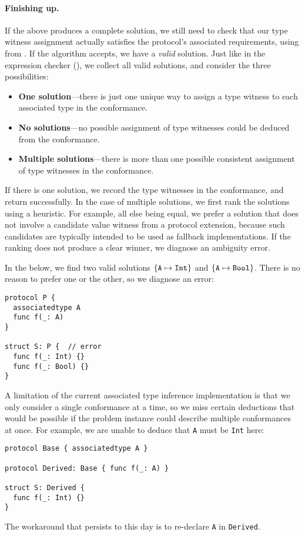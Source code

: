 \documentclass[../generics]{subfiles}
\begin{document}
\paragraph{Finishing up.}
If the above produces a complete solution, we still need to check that our type witness assignment actually satisfies the protocol's associated requirements, using  from . If the algorithm accepts, we have a \emph{valid} solution. Just like in the expression checker (), we collect all valid solutions, and consider the three possibilities:
\begin{itemize}
\item \textbf{One solution}---there is just one unique way to assign a type witness to each associated type in the conformance.
\item \textbf{No solutions}---no possible assignment of type witnesses could be deduced from the conformance.
\item \textbf{Multiple solutions}---there is more than one possible consistent assignment of type witnesses in the conformance.
\end{itemize}
If there is one solution, we record the type witnesses in the conformance, and return successfully. In the case of multiple solutions, we first rank the solutions using a heuristic. For example, all else being equal, we prefer a solution that does not involve a candidate value witness from a protocol extension, because such candidates are typically intended to be used as fallback implementations. If the ranking does not produce a clear winner, we diagnose an ambiguity error.

\begin{example}\label{ambiguous associated type example}
In the below, we find two valid solutions $\{\texttt{A} \mapsto \texttt{Int}\}$ and $\{\texttt{A} \mapsto \texttt{Bool}\}$. There is no reason to prefer one or the other, so we diagnose an error:
\begin{Verbatim}
protocol P {
  associatedtype A
  func f(_: A)
}

struct S: P {  // error
  func f(_: Int) {}
  func f(_: Bool) {}
}
\end{Verbatim}
\end{example}

\begin{example}
A limitation of the current associated type inference implementation is that we only consider a single conformance at a time, so we miss certain deductions that would be possible if the problem instance could describe multiple conformances at once. For example, we are unable to deduce that \texttt{A} must be \texttt{Int} here:
\begin{Verbatim}
protocol Base { associatedtype A }

protocol Derived: Base { func f(_: A) }

struct S: Derived {
  func f(_: Int) {}
}
\end{Verbatim}
The workaround that persists to this day is to re-declare \texttt{A} in \texttt{Derived}.
\end{example}
\end{document}
